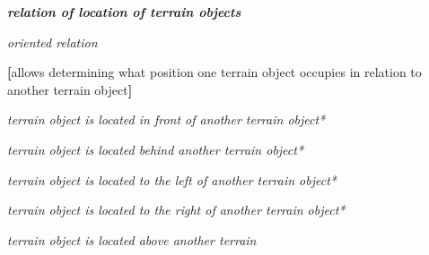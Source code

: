 \documentclass{article}
\begin{document}
\begin{multicols}{2}
    \noindent \textit{\textbf{relation of location of terrain objects}}
    \vspace{-0.3cm}
    \begin{description}[leftmargin=!, labelwidth=1cm, itemsep=-1mm]
        \item[$\subset$] \textit{oriented relation}
        \item[$\coloneqq$] \textbf{[}allows determining what position one terrain object occupies in relation to another terrain object\textbf{]}
        \item[$\supset$] \textit{terrain object is located in front of another terrain object*}
        \item[$\supset$] \textit{terrain object is located behind another terrain object*}
        \item[$\supset$] \textit{terrain object is located to the left of another terrain object*}
        \item[$\supset$] \textit{terrain object is located to the right of another terrain object*}
        \item[$\supset$] \textit{terrain object is located above another terrain}
    \end{description}
\end{multicols}
\end{document}
